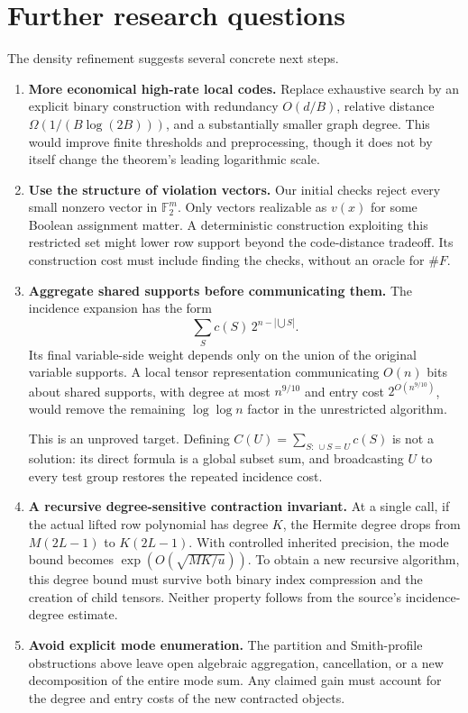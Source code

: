 \documentclass[11pt]{article}
\theoremstyle{remark}
\newcommand{\F}{\mathbb F}
\begin{document}
\section{Further research questions}\label{sec:research}
The density refinement suggests several concrete next steps.
\begin{enumerate}
\item \textbf{More economical high-rate local codes.}
Replace exhaustive search by an explicit binary construction with
redundancy \(O(d/B)\), relative distance
\(\Omega(1/(B\log(2B)))\), and a substantially smaller graph degree.
This would improve finite thresholds and preprocessing, though it
does not by itself change the theorem's leading logarithmic scale.

\item \textbf{Use the structure of violation vectors.}
Our initial checks reject every small nonzero vector in \(\F_2^m\).
Only vectors realizable as \(v(x)\) for some Boolean assignment matter.
A deterministic construction exploiting this restricted set might
lower row support beyond the code-distance tradeoff. Its construction
cost must include finding the checks, without an oracle for \(\#F\).

\item \textbf{Aggregate shared supports before communicating them.}
The incidence expansion has the form
\[
 \sum_{S} c(S)\,2^{n-|\bigcup S|}.
\]
Its final variable-side weight depends only on the union of the
original variable supports. A local tensor representation communicating
\(O(n)\) bits about shared supports, with degree at most \(n^{9/10}\)
and entry cost \(2^{O(n^{9/10})}\), would remove the remaining
\(\log\log n\) factor in the unrestricted algorithm.

This is an unproved target. Defining
\(C(U)=\sum_{S:\,\cup S=U}c(S)\) is not a solution:
its direct formula is a global subset sum, and broadcasting \(U\)
to every test group restores the repeated incidence cost.

\item \textbf{A recursive degree-sensitive contraction invariant.}
At a single call, if the actual lifted row polynomial has degree \(K\),
the Hermite degree drops from \(M(2L-1)\) to \(K(2L-1)\).
With controlled inherited precision, the mode bound becomes
\(\exp(O(\sqrt{MK/u}))\).
To obtain a new recursive algorithm, this degree bound must survive
both binary index compression and the creation of child tensors.
Neither property follows from the source's incidence-degree estimate.

\item \textbf{Avoid explicit mode enumeration.}
The partition and Smith-profile obstructions above leave open
algebraic aggregation, cancellation, or a new decomposition of the
entire mode sum. Any claimed gain must account for the degree and
entry costs of the new contracted objects.
\end{enumerate}
\end{document}
